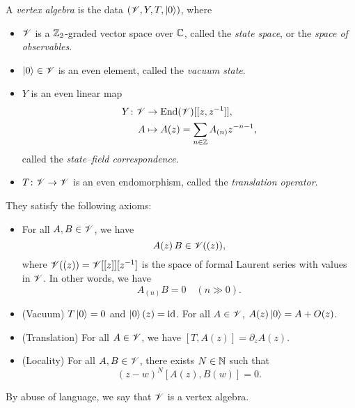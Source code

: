 \begin{definition}
    A \emph{vertex algebra} is the data $(\mathscr{V}, Y, T, \mathinner{\mathopen{|}0\mathclose{\rangle}})$, where
    \begin{itemize}
        \item
            $\mathscr{V}$ is a $\mathbb{Z}_2$-graded vector space over $\mathbb{C}$,
            called the \emph{state space},
            or the \emph{space of observables}.
        \item
            $\mathinner{\mathopen{|}0\mathclose{\rangle}} \in \mathscr{V}$ is an even element,
            called the \emph{vacuum state}.
        \item
            $Y$ is an even linear map
            \begin{align*}
                Y \colon \mathscr{V} & \to \operatorname{End}(\mathscr{V}) [[z, z^{-1}]], \\
                A & \mapsto A (z) = \sum_{n \in \mathbb{Z}} A_{(n)} z^{-n - 1},
            \end{align*}
            called the \emph{state--field correspondence}.
        \item
            $T \colon \mathscr{V} \to \mathscr{V}$
            is an even endomorphism,
            called the \emph{translation operator}.
    \end{itemize}
    They satisfy the following axioms:
    \begin{itemize}
        \item
            For all $A, B \in \mathscr{V}$, we have
            \[
                A (z) \, B \in \mathscr{V} ((z)),
            \]
            where $\mathscr{V} ((z)) = \mathscr{V} [[z]] [z^{-1}]$
            is the space of formal Laurent series
            with values in $\mathscr{V}$.
            In other words, we have
            \[
                A_{(n)} B = 0 \quad (n \gg 0).
            \]
            
        \item
            (Vacuum)
            $T \mathinner{\mathopen{|}0\mathclose{\rangle}} = 0$
            and $\mathinner{\mathopen{|}0\mathclose{\rangle}} (z) = \operatorname{id}$.
            For all $A \in \mathscr{V}$,
            $A (z) \mathinner{\mathopen{|}0\mathclose{\rangle}} = A + O (z)$.
            
        \item
            (Translation)
            For all $A \in \mathscr{V}$, we have $[T, A(z)] = \partial_z A(z)$.
            
        \item
            (Locality)
            For all $A, B \in \mathscr{V}$, there exists $N \in \mathbb{N}$ such that
            \[
                (z - w)^N [A(z), B(w)] = 0.
            \]
    \end{itemize}
    By abuse of language,
    we say that $\mathscr{V}$ is a vertex algebra.
    \varqed
\end{definition}

